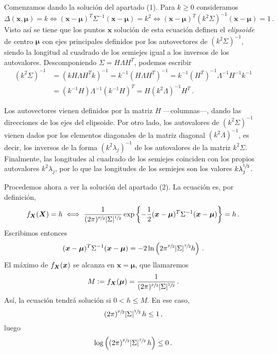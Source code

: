 \begin{sol}
  Comenzamos dando la solución del apartado (1). Para $k \geq 0$ consideramos \[
      \Delta(\boldsymbol x, \boldsymbol \mu) = k \iff (\boldsymbol x - \boldsymbol \mu)^T\Sigma^{-1}(\boldsymbol x - \boldsymbol \mu) = k^2 \iff (\boldsymbol x - \boldsymbol \mu)^T(k^2\Sigma)^{-1}(\boldsymbol x - \boldsymbol \mu) = 1\,.
      \] Visto así se tiene que los puntos $\boldsymbol x$ solución de esta ecuación definen el \textit{elipsoide} de centro $\boldsymbol \mu$ con ejes principales definidos por los autovectores de $(k^2\Sigma)^{-1}$, siendo la longitud al cuadrado de los semiejes igual a los inversos de los autovalores.
      Descomponiendo $\Sigma = H\Lambda H^T$, podemos escribir \begin{align*}
        (k^2\Sigma)^{-1} 
        &= (kH\Lambda H^T k)^{-1} 
        = k^{-1}(H\Lambda H^T)^{-1} 
        = k^{-1}(H^T)^{-1}\Lambda^{-1}H^{-1}k^{-1}\\
        &= (k^{-1}H)\Lambda^{-1}(k^{-1}H)^T
        = H(k^2\Lambda)^{-1}H^T\,.
      \end{align*}

      Los autovectores vienen definidos por la matriz $H$ —columnas—, dando las direcciones de los ejes del elipsoide. Por otro lado, los autovalores de $(k^2\Sigma)^{-1}$ vienen dados por los elementos diagonales de la matriz diagonal $(k^2\Lambda)^{-1}$, es decir, los inversos de la forma $(k^2\lambda_j)^{-1}$ de los autovalores de la matriz $k^2\Sigma$.
      Finalmente, las longitudes al cuadrado de los semiejes coinciden con los propios autovalores $k^2\lambda_j$, por lo que las longitudes de los semiejes son los valores $k\lambda_j^{\sfrac{1}{2}}$.

      Procedemos ahora a ver la solución del apartado (2). La ecuación es, por definición, \[
        f_{\boldsymbol{X}}(\boldsymbol X) 
        = h \iff \frac{1}{(2\pi)^{\sfrac{p}{2}} |\Sigma|^{\sfrac{1}{2}}}\exp\left\{-\frac{1}{2}(\boldsymbol x - \boldsymbol \mu)^T\Sigma^{-1}(\boldsymbol x - \boldsymbol \mu)\right\} 
        = h\,.\] 
      Escribimos entonces \[
        (\boldsymbol x - \boldsymbol \mu)^T \Sigma^{-1}(\boldsymbol x - \boldsymbol \mu) 
        = - 2\ln\left(2\pi^{\sfrac{p}{2}}|\Sigma|^{\sfrac{1}{2}}h\right)\,.
          \]
      El máximo de $f_{\boldsymbol{X}}(\boldsymbol x)$ se alcanza en $\boldsymbol x = \boldsymbol \mu$, que llamaremos \[
        M 
        \vcentcolon= f_{\boldsymbol{X}}(\boldsymbol \mu) 
        = \frac{1}{(2\pi)^{\sfrac{p}{2}} |\Sigma|^{\sfrac{1}{2}}}\,.
      \] Así, la ecuación tendrá solución si $0 < h \leq M$. En ese caso, \[(2\pi)^{\sfrac{p}{2}}|\Sigma|^{\sfrac{1}{2}}\,h \leq 1\,,\] luego \[\log\left((2\pi)^{\sfrac{p}{2}}|\Sigma|^{\sfrac{1}{2}}\,h\right) \leq 0\,.\]
\end{sol}

